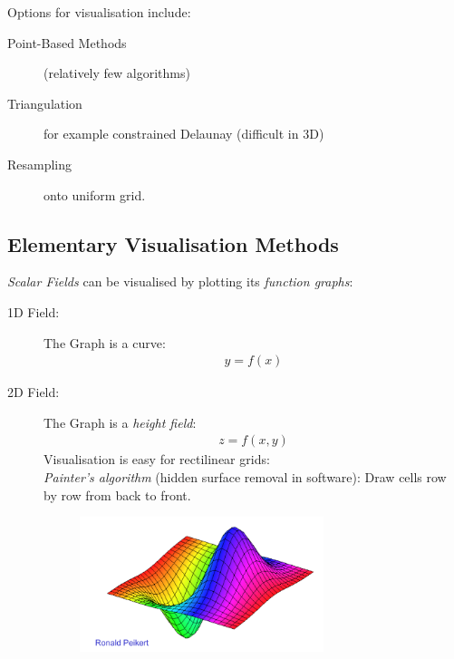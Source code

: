 Options for visualisation include:
\begin{description}
\item[Point-Based Methods] (relatively few algorithms)
\item[Triangulation] for example constrained Delaunay (difficult in 3D)
\item[Resampling] onto uniform grid.
\end{description}

\subsection{Elementary Visualisation Methods}
\emph{Scalar Fields} can be visualised by plotting its \emph{function graphs}:
\begin{description}
    \item[1D Field:] The Graph is a curve:
        \begin{align*}
            y = f(x)
        \end{align*}
    \item[2D Field:] The Graph is a \emph{height field}:
        \begin{align*}
            z = f(x,y)
        \end{align*}
        Visualisation is easy for rectilinear grids:\\
        \emph{Painter's algorithm} (hidden surface removal in software): Draw cells row by row from back to front.
        \begin{figure}[H]
            \centering
            \includegraphics[width=0.7\textwidth]{img/01_painters_algorithm}
        \end{figure}
\end{description}

